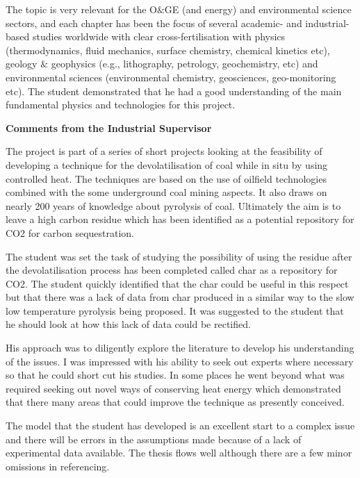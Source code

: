\documentclass[14pt,twoside]{report}
\begin{document}
The topic is very relevant for the O$\&$GE (and energy) and environmental science sectors, and each chapter has been the focus of several academic- and industrial-based studies worldwide with clear cross-fertilisation with physics (thermodynamics, fluid mechanics, surface chemistry, chemical kinetics etc), geology $\&$ geophysics (e.g., lithography, petrology, geochemistry, etc) and environmental sciences (environmental chemistry, geosciences, geo-monitoring etc). The student demonstrated that he had a good understanding of the main fundamental physics and technologies for this project.


\medskip
\begin{flushleft}
{\bf Comments from the Industrial Supervisor}
\end{flushleft}
\medskip 

The project is part of a series of short projects looking at the feasibility of developing a technique for the devolatilisation of coal while in situ by using controlled heat. The techniques are based on the use of oilfield technologies combined with the some underground coal mining aspects.  It also draws on nearly 200 years of knowledge about pyrolysis of coal. Ultimately the aim is to leave a high carbon residue which has been identified as a potential repository for CO2 for carbon sequestration.

The student was set the task of studying the possibility of using the residue after the devolatilisation process has been completed called char as a repository for CO2. The student quickly identified that the char could be useful in this respect but that there was a lack of data from char produced in a similar way to the slow low temperature pyrolysis being proposed.  It was suggested to the student that he should look at how this lack of data could be rectified.

His approach was to diligently explore the literature to develop his understanding of the issues.  I was impressed with his ability to seek out experts where necessary so that he could short cut his studies.  In some places he went beyond what was required seeking out novel ways of conserving heat energy which demonstrated that there many areas that could improve the technique as presently conceived.

The model that the student has developed is an excellent start to a complex issue and there will be errors in the assumptions made because of a lack of experimental data available. The thesis flows well although there are a few minor omissions in referencing. 
\end{document}
